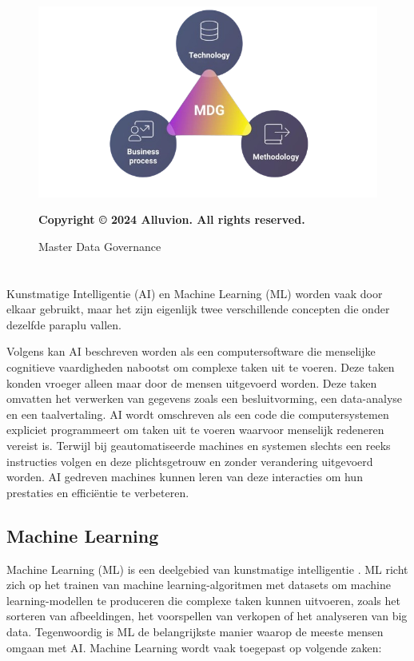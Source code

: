 \begin{figure}[htbp]
  \centering
  \includegraphics[scale=0.5]{../images/AlluvionMDG.png}
  \caption{Master Data Governance}
  \small\textbf{Copyright © 2024 Alluvion. All rights reserved.}
\end{figure}

\section{}%
\label{sec:ai}
Kunstmatige Intelligentie (AI) en Machine Learning (ML) worden vaak door elkaar gebruikt, maar het zijn eigenlijk twee verschillende concepten die onder dezelfde paraplu vallen.

Volgens \textcite{Coursera2024} kan AI beschreven worden als een computersoftware die menselijke cognitieve vaardigheden nabootst om complexe taken uit te voeren. Deze taken konden vroeger alleen maar door de mensen uitgevoerd worden. Deze taken omvatten het verwerken van gegevens zoals een besluitvorming, een data-analyse en een taalvertaling. AI wordt omschreven als een code die computersystemen expliciet programmeert om taken uit te voeren waarvoor menselijk redeneren vereist is. Terwijl bij geautomatiseerde machines en systemen slechts een reeks instructies volgen en deze plichtsgetrouw en zonder verandering uitgevoerd worden. AI gedreven machines kunnen leren van deze interacties om hun prestaties en efficiëntie te verbeteren. 

\subsection{Machine Learning}
Machine Learning (ML) is een deelgebied van kunstmatige intelligentie \autocite{Coursera2024}. ML richt zich op het trainen van machine learning-algoritmen met datasets om machine learning-modellen te produceren die complexe taken kunnen uitvoeren, zoals het sorteren van afbeeldingen, het voorspellen van verkopen of het analyseren van big data. Tegenwoordig is ML de belangrijkste manier waarop de meeste mensen omgaan met AI. Machine Learning wordt vaak toegepast op volgende zaken: 

